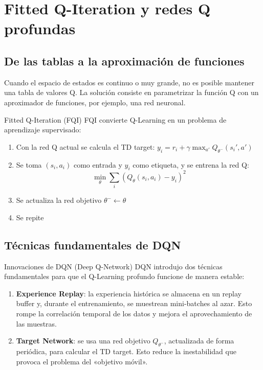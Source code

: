 \documentclass[a4paper]{article}
\begin{document}
\section{Fitted Q-Iteration y redes Q profundas}

\subsection{De las tablas a la aproximación de funciones}

Cuando el espacio de estados es continuo o muy grande, no es posible mantener una tabla de valores Q. La solución consiste en parametrizar la función Q con un aproximador de funciones, por ejemplo, una red neuronal.

\begin{importantbox}{Fitted Q-Iteration (FQI)}
FQI convierte Q-Learning en un problema de aprendizaje supervisado:
\begin{enumerate}
    \item Con la red Q actual se calcula el TD target: $y_i = r_i + \gamma \max_{a'} Q_{\theta^-}(s_i', a')$
    \item Se toma $(s_i, a_i)$ como entrada y $y_i$ como etiqueta, y se entrena la red Q:
    $$\min_\theta \sum_i \left(Q_\theta(s_i, a_i) - y_i\right)^2$$
    \item Se actualiza la red objetivo $\theta^- \leftarrow \theta$
    \item Se repite
\end{enumerate}
\end{importantbox}

\subsection{Técnicas fundamentales de DQN}

\begin{importantbox}{Innovaciones de DQN (Deep Q-Network)}
DQN introdujo dos técnicas fundamentales para que el Q-Learning profundo funcione de manera estable:
\begin{enumerate}
    \item \textbf{Experience Replay}: la experiencia histórica se almacena en un replay buffer y, durante el entrenamiento, se muestrean mini-batches al azar. Esto rompe la correlación temporal de los datos y mejora el aprovechamiento de las muestras.
    \item \textbf{Target Network}: se usa una red objetivo $Q_{\theta^-}$, actualizada de forma periódica, para calcular el TD target. Esto reduce la inestabilidad que provoca el problema del «objetivo móvil».
\end{enumerate}
\end{importantbox}
\end{document}
